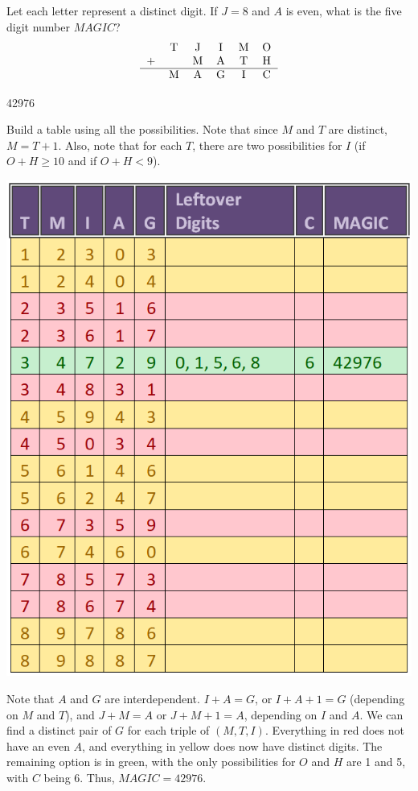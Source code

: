 \documentclass[11pt]{article}
\begin{document}
\begin{problem}
Let each letter represent a distinct digit. If $J=8$ and $A$ is even, what is the five digit number $MAGIC$?
\[
    \begin{tabular}{c c c c c c}
        & T & J & I & M & O \\
        + & & M & A & T & H \\
        \hline
        & M & A & G & I & C
    \end{tabular}
\]
\end{problem}

\begin{answer}
42976
\end{answer}

\begin{solution}
Build a table using all the possibilities. Note that since $M$ and $T$ are distinct, $M=T+1$. Also, note that for each $T$, there are two possibilities for $I$ (if $O+H \geq 10$ and if $O+H < 9$).
\begin{center}
    \includegraphics[scale=0.5]{guts_table}
\end{center}
Note that $A$ and $G$ are interdependent. $I+A=G$, or $I+A+1=G$ (depending on $M$ and $T$), and $J+M=A$ or $J+M+1=A$, depending on $I$ and $A$. We can find a distinct pair of $G$ for each triple of $(M, T, I)$. Everything in red does not have an even $A$, and everything in yellow does now have distinct digits. The remaining option is in green, with the only possibilities for $O$ and $H$ are 1 and 5, with $C$ being 6. Thus,  $MAGIC=\boxed{42976}$.
\end{solution}
\end{document}
